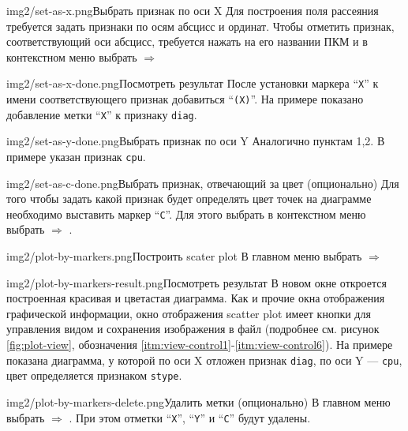 \documentclass[12pt,tikz]{instruction}
\begin{document}
\begin{steps}
	\begin{ist}{img2/set-as-x.png}{Выбрать признак по оси X}
		Для построения поля рассеяния требуется задать признаки по осям абсцисс и ординат. Чтобы отметить признак, соответствующий оси абсцисс, требуется нажать на его названии ПКМ и в контекстном меню выбрать
		 $\Rightarrow$ 
	\end{ist}
	\begin{ist}{img2/set-as-x-done.png}{Посмотреть результат}
		После установки маркера ``\texttt{X}'' к имени соответствующего признак добавиться ``\texttt{(X)}''. На примере показано добавление метки ``\texttt{X}''  к признаку \texttt{diag}.
	\end{ist}	
	\begin{ist}{img2/set-as-y-done.png}{Выбрать признак по оси Y}
		Аналогично пунктам 1,2. В примере указан признак \texttt{cpu}.
	\end{ist}
	\begin{ist}{img2/set-as-c-done.png}{Выбрать признак, отвечающий за цвет (опционально)}
		Для того чтобы задать какой признак будет определять цвет точек на диаграмме необходимо выставить маркер ``\texttt{C}''. Для этого выбрать в контекстном меню выбрать  $\Rightarrow$ . 
	\end{ist}
	\begin{ist}{img2/plot-by-markers.png}{Построить scater plot}
		В главном меню выбрать  $\Rightarrow$  
	\end{ist}
	\begin{ist}{img2/plot-by-markers-result.png}{Посмотреть результат}
		В новом окне откроется построенная красивая и цветастая диаграмма. Как и прочие окна отображения графической информации, окно отображения scatter plot имеет кнопки для управления видом и сохранения изображения в файл (подробнее см. рисунок \ref{fig:plot-view}, обозначения \ref{itm:view-control1}-\ref{itm:view-control6}). На примере показана диаграмма, у которой по оси X отложен признак \texttt{diag}, по оси Y --- \texttt{cpu}, цвет определяется признаком \texttt{stype}.
	\end{ist}
	\begin{ist}{img2/plot-by-markers-delete.png}{Удалить метки (опционально)}
		В главном меню выбрать  $\Rightarrow$ . При этом отметки ``\texttt{X}'', ``\texttt{Y}'' и ``\texttt{C}'' будут удалены.
	\end{ist}
	
\end{steps}
\end{document}
